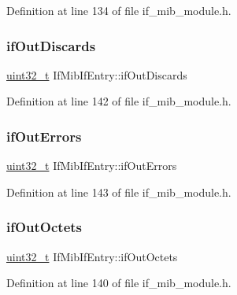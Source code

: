 Definition at line 134 of file if\+\_\+mib\+\_\+module.\+h.

\mbox{\label{structIfMibIfEntry_a513b1816145273f0a8c76ed0aa632e8e}} 
\subsubsection{\texorpdfstring{if\+Out\+Discards}{ifOutDiscards}}
{\footnotesize\ttfamily \hyperlink{stdint_8h_a435d1572bf3f880d55459d9805097f62}{uint32\+\_\+t} If\+Mib\+If\+Entry\+::if\+Out\+Discards}



Definition at line 142 of file if\+\_\+mib\+\_\+module.\+h.

\mbox{\label{structIfMibIfEntry_a6e2a5f25673dd66c56c63972f57bf2dd}} 
\subsubsection{\texorpdfstring{if\+Out\+Errors}{ifOutErrors}}
{\footnotesize\ttfamily \hyperlink{stdint_8h_a435d1572bf3f880d55459d9805097f62}{uint32\+\_\+t} If\+Mib\+If\+Entry\+::if\+Out\+Errors}



Definition at line 143 of file if\+\_\+mib\+\_\+module.\+h.

\mbox{\label{structIfMibIfEntry_a84ccab237960cd7e7bc3f5b39bd88071}} 
\subsubsection{\texorpdfstring{if\+Out\+Octets}{ifOutOctets}}
{\footnotesize\ttfamily \hyperlink{stdint_8h_a435d1572bf3f880d55459d9805097f62}{uint32\+\_\+t} If\+Mib\+If\+Entry\+::if\+Out\+Octets}



Definition at line 140 of file if\+\_\+mib\+\_\+module.\+h.

